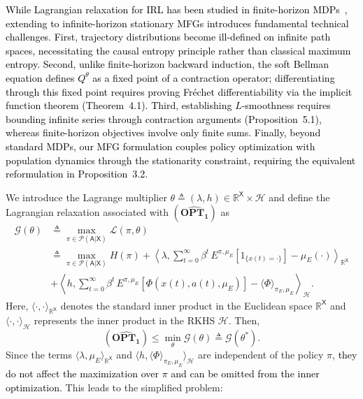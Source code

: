 \documentclass[11pt]{article}
\newcommand{\R}{\mathbb{R}}
\newcommand{\sX}{{\mathsf X}}
\newcommand{\sA}{{\mathsf A}}
\newcommand{\cH}{{\mathcal H}}
\newcommand{\cL}{{\mathcal L}}
\newcommand{\Pnew}{{\mathcal P}}
\newcommand{\cG}{{\mathcal G}}
\newcommand{\tb}[1]{\textcolor{black}{#1}} %
\begin{document}


\tb{While Lagrangian relaxation for IRL has been studied in finite-horizon MDPs~\cite{GlTo22,ZiBaDe10,ZiBaDe13}, extending to infinite-horizon stationary MFGs introduces fundamental technical challenges. First, trajectory distributions become ill-defined on infinite path spaces, necessitating the causal entropy principle rather than classical maximum entropy. Second, unlike finite-horizon backward induction, the soft Bellman equation defines $Q^{\theta}$ as a fixed point of a contraction operator; differentiating through this fixed point requires proving Fr\'{e}chet differentiability via the implicit function theorem (Theorem~4.1). Third, establishing $L$-smoothness requires bounding infinite series through contraction arguments (Proposition~5.1), whereas finite-horizon objectives involve only finite sums. Finally, beyond standard MDPs, our MFG formulation couples policy optimization with population dynamics through the stationarity constraint, requiring the equivalent reformulation in Proposition~3.2. }

We introduce the Lagrange multiplier $\theta \triangleq (\lambda,h) \in \R^{\sX} \times \cH$ and define the Lagrangian relaxation associated with $\mathbf{(\widehat{OPT_1})}$ as
\begin{align*}
  \cG(\theta)  &\triangleq \max_{\pi \in \Pnew(\sA|\sX)} \cL(\pi,\theta) \\ 
  &\triangleq \max_{\pi \in \Pnew(\sA|\sX)}   H(\pi) + \left \langle \lambda, \sum_{t=0}^{\infty} \beta^t \, E^{\pi,\mu_E}[1_{\{x(t)=\cdot\}}] - \mu_E(\cdot) \right \rangle_{\R^{\sX}} 
 \\ & +\left \langle h, \sum_{t=0}^{\infty} \beta^t \, E^{\pi,\mu_E}[\Phi(x(t),a(t),\mu_E)] - \langle \Phi \rangle_{\pi_E,\mu_E} \right \rangle_{\cH}.
\end{align*}
Here, $\langle \cdot,\cdot \rangle_{\R^{\sX}}$ denotes the standard inner product in the Euclidean space $\R^{\sX}$ and $\langle \cdot,\cdot \rangle_{\cH}$ represents the inner product in the RKHS $\cH$. Then,
$$
\mathbf{(\widehat{OPT_1})} \leq \min_{\theta} \cG(\theta) \triangleq \cG(\theta^*).
$$
Since the terms $\langle \lambda, \mu_E \rangle_{\R^{\sX}}$ and $\langle h, \langle \Phi \rangle_{\pi_E,\mu_E} \rangle_{\cH}$ are independent of the policy $\pi$, \tb{they do not affect the maximization over $\pi$ and can be omitted from the inner optimization.} 
This leads to the simplified problem:
\end{document}
